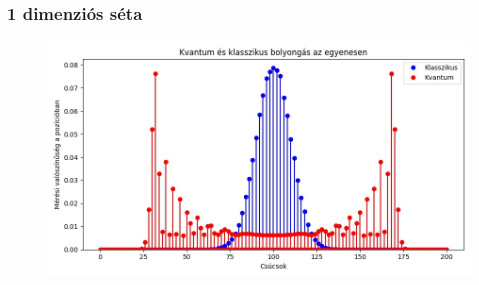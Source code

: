 \documentclass[aspectratio=169]{beamer}
\begin{document}
\begin{frame}
  \frametitle{1 dimenziós séta}
  \begin{figure}[H]
    \centering
    \includegraphics[width=0.9\linewidth]{./figures/teve.jpg}
  \end{figure}
\end{frame}
\end{document}
